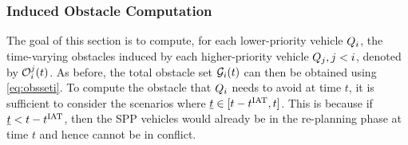 %

\subsubsection{Induced Obstacle Computation} \label{sec:intruder_iocomp}
The goal of this section is to compute, for each lower-priority vehicle $Q_i$, the time-varying obstacles induced by each higher-priority vehicle $Q_j, j < i$, denoted by $\mathcal{O}_i^j(t)$. As before, the total obstacle set $\mathcal{G}_i(t)$ can then be obtained using \eqref{eq:obsseti}. To compute the obstacle that $Q_i$ needs to avoid at time $t$, it is sufficient to consider the scenarios where $\underline{t} \in [t-t^\text{IAT}, t]$. This is because if $\underline{t} < t - t^\text{IAT}$, then the SPP vehicles would already be in the re-planning phase at time $t$ and hence cannot be in conflict. 

